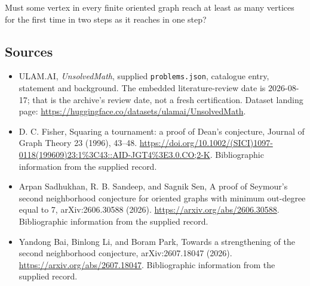 \documentclass[11pt,a4paper]{article}
\begin{document}
Must some vertex in every finite oriented graph reach at least as many vertices for the first time in two steps as it reaches in one step?

\subsection{Sources}

{\small

\begin{itemize}

\item[\hypertarget{source:statement:1}{S1}] ULAM.AI, \emph{UnsolvedMath}, supplied \texttt{problems.json}, catalogue entry, statement and background. The embedded literature-review date is 2026-08-17; that is the archive’s review date, not a fresh certification. Dataset landing page: \url{https://huggingface.co/datasets/ulamai/UnsolvedMath}.

\item[\hypertarget{source:statement:2}{S2}] D. C. Fisher, Squaring a tournament: a proof of Dean's conjecture, Journal of Graph Theory 23 (1996), 43–48. \url{https://doi.org/10.1002/(SICI)1097-0118(199609)23:1%3C43::AID-JGT4%3E3.0.CO;2-K}. Bibliographic information from the supplied record.

\item[\hypertarget{source:statement:3}{S3}] Arpan Sadhukhan, R. B. Sandeep, and Sagnik Sen, A proof of Seymour's second neighborhood conjecture for oriented graphs with minimum out-degree equal to 7, arXiv:2606.30588 (2026). \url{https://arxiv.org/abs/2606.30588}. Bibliographic information from the supplied record.

\item[\hypertarget{source:statement:4}{S4}] Yandong Bai, Binlong Li, and Boram Park, Towards a strengthening of the second neighborhood conjecture, arXiv:2607.18047 (2026). \url{https://arxiv.org/abs/2607.18047}. Bibliographic information from the supplied record.

\end{itemize}

}

\label{end:statement}
\end{document}
